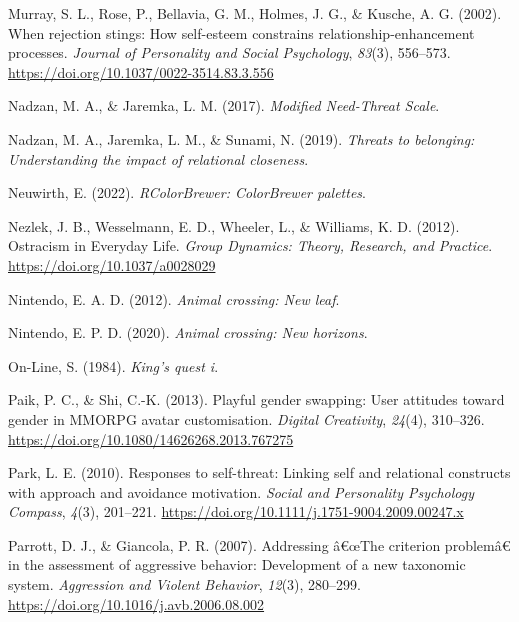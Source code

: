 \documentclass[
]{udthesis}
\newlength{\cslhangindent}
\newenvironment{CSLReferences}[2] %
 {\begin{list}{}{%
  \setlength{\itemindent}{0pt}
  \setlength{\leftmargin}{0pt}
  \setlength{\parsep}{0pt}
  \ifodd #1
   \setlength{\leftmargin}{\cslhangindent}
   \setlength{\itemindent}{-1\cslhangindent}
  \fi
  \setlength{\itemsep}{#2\baselineskip}}}
 {\end{list}}
\begin{document}
\begin{CSLReferences}{1}{0}
Murray, S. L., Rose, P., Bellavia, G. M., Holmes, J. G., \& Kusche, A. G. (2002). When rejection stings: {How} self-esteem constrains relationship-enhancement processes. \emph{Journal of Personality and Social Psychology}, \emph{83}(3), 556--573. \url{https://doi.org/10.1037/0022-3514.83.3.556}

Nadzan, M. A., \& Jaremka, L. M. (2017). \emph{Modified {Need}-{Threat Scale}}.

Nadzan, M. A., Jaremka, L. M., \& Sunami, N. (2019). \emph{Threats to belonging: Understanding the impact of relational closeness}.

Neuwirth, E. (2022). \emph{RColorBrewer: ColorBrewer palettes}.

Nezlek, J. B., Wesselmann, E. D., Wheeler, L., \& Williams, K. D. (2012). Ostracism in {Everyday Life}. \emph{Group Dynamics: Theory, Research, and Practice}. \url{https://doi.org/10.1037/a0028029}

Nintendo, E. A. D. (2012). \emph{Animal crossing: New leaf}.

Nintendo, E. P. D. (2020). \emph{Animal crossing: New horizons}.

On-Line, S. (1984). \emph{King{'}s quest i}.

Paik, P. C., \& Shi, C.-K. (2013). Playful gender swapping: User attitudes toward gender in {MMORPG} avatar customisation. \emph{Digital Creativity}, \emph{24}(4), 310--326. \url{https://doi.org/10.1080/14626268.2013.767275}

Park, L. E. (2010). Responses to self-threat: {Linking} self and relational constructs with approach and avoidance motivation. \emph{Social and Personality Psychology Compass}, \emph{4}(3), 201--221. \url{https://doi.org/10.1111/j.1751-9004.2009.00247.x}

Parrott, D. J., \& Giancola, P. R. (2007). Addressing â€œ{The} criterion problemâ€ in the assessment of aggressive behavior: {Development} of a new taxonomic system. \emph{Aggression and Violent Behavior}, \emph{12}(3), 280--299. \url{https://doi.org/10.1016/j.avb.2006.08.002}


\end{CSLReferences}
\end{document}
